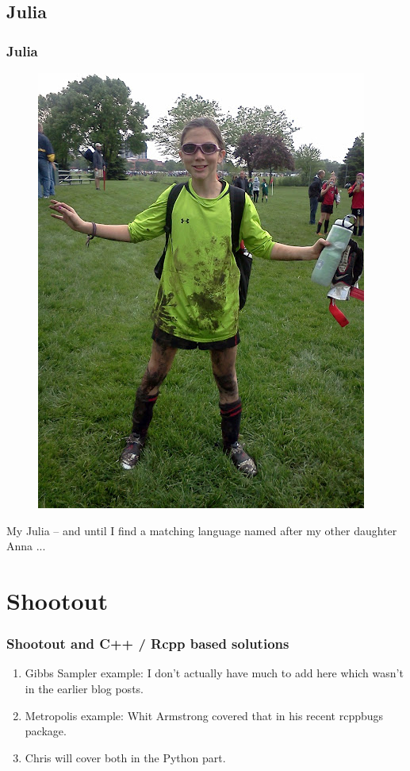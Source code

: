 \documentclass[dvipsnames,compress,pdflatex,beamer]{beamer}
\begin{document}
\subsection{Julia}
\begin{frame}
  \frametitle{Julia}
  \pause

  \begin{figure}
    \includegraphics[scale=0.3]{images/JEasGoalie.jpeg}
  \end{figure}

  \medskip

  My Julia -- and until I find a matching language named after my other
  daughter Anna ...

\end{frame}

\section{Shootout}
\begin{frame}
  \frametitle{Shootout and C++ / Rcpp based solutions}

  \begin{enumerate}[<+->]
  \item Gibbs Sampler example:  I don't actually have much to add here which
    wasn't in the earlier blog posts.
  \item Metropolis example:  Whit Armstrong covered that in his recent
    rcppbugs package.
  \item Chris will cover both in the Python part.
  \end{enumerate}
\end{frame}
\end{document}
